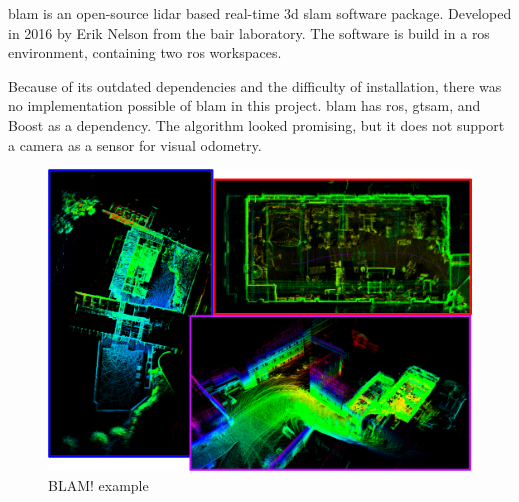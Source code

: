 \acs{blam} is an open\hyp{}source \acs{lidar} based real\hyp{}time \acs{3d} \acs{slam} software package. Developed in 2016 by Erik Nelson from the \ac{bair} laboratory. The software is build in a \acs{ros} environment, containing two \acs{ros} workspaces. \cite{github_blam}

Because of its outdated dependencies and the difficulty of installation, there was no implementation possible of \acs{blam} in this project. \acs{blam} has \acs{ros}, \acs{gtsam}, and Boost as a dependency. The algorithm looked promising, but it does not support a camera as a sensor for visual odometry.

\begin{figure}[!h]
  \centering
  \includegraphics[width=\linewidth]{images/blam.png}
  \caption{BLAM! example \cite{github_blam}}
\end{figure}